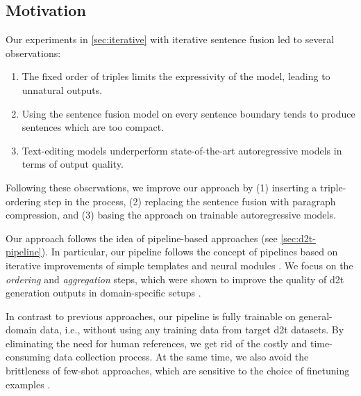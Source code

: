 \subsection{Motivation}
Our experiments in \autoref{sec:iterative} with iterative sentence fusion led to several observations:

\begin{enumerate}
    \item The fixed order of triples limits the expressivity of the model, leading to unnatural outputs.
    \item Using the sentence fusion model on every sentence boundary tends to produce sentences which are too compact.
    \item Text-editing models underperform state-of-the-art autoregressive models in terms of output quality.
\end{enumerate}

Following these observations, we improve our approach by (1) inserting a triple-ordering step in the process, (2) replacing the sentence fusion with paragraph compression, and (3) basing the approach on trainable autoregressive models.


Our approach follows the idea of pipeline-based approaches (see \autoref{sec:d2t-pipeline}). In particular, our pipeline follows the concept of pipelines based on iterative improvements of simple templates  \cite{laha2020scalable} and neural modules \cite{ferreiraNeuralDatatotextGeneration2019}. We focus on the \emph{ordering} and \emph{aggregation} steps, which were shown to improve the quality of \ac{d2t} generation outputs in domain-specific setups \cite{moryossef2019improving,moryossef2019step,trisedyaSentenceGenerationEntity2020,su2021plan}.

In contrast to previous approaches, our pipeline is fully trainable on general-domain data, i.e., without using any training data from target \ac{d2t} datasets. By eliminating the need for human references, we get rid of the costly and time-consuming data collection process. At the same time, we also avoid the brittleness of few-shot approaches, which are sensitive to the choice of finetuning examples \cite{chenFewShotNLGPreTrained2019,suFewShotTabletoTextGeneration2021,changSelectGenChallengeFinding2021}.

